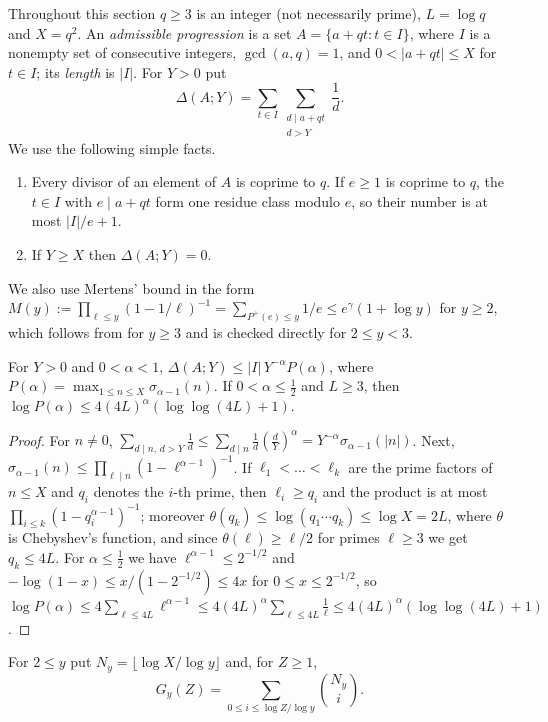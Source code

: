 Throughout this section $q\ge3$ is an integer (not necessarily prime), $L=\log q$ and $X=q^2$. An \emph{admissible
progression} is a set $A=\{a+qt:t\in I\}$, where $I$ is a nonempty set of consecutive integers, $\gcd(a,q)=1$, and
$0<|a+qt|\le X$ for $t\in I$; its \emph{length} is $|I|$. For $Y>0$ put
\[
\Delta(A;Y)=\sum_{t\in I}\sum_{\substack{d\mid a+qt\\ d>Y}}\frac1d.
\]
We use the following simple facts.
\begin{enumerate}[label=(F\arabic*),leftmargin=*]
\item Every divisor of an element of $A$ is coprime to $q$. If $e\ge1$ is coprime to $q$, the $t\in I$ with
$e\mid a+qt$ form one residue class modulo $e$, so their number is at most $|I|/e+1$.
\item If $Y\ge X$ then $\Delta(A;Y)=0$.
\end{enumerate}
We also use Mertens' bound in the form $M(y):=\prod_{\ell\le y}(1-1/\ell)^{-1}=\sum_{P^+(e)\le y}1/e\le e^\gamma(1+\log
y)$ for $y\ge2$, which follows from \cite[(3.30)]{b23} for $y\ge3$ and is checked directly for $2\le y<3$.

\begin{lemma}[Rankin]\label{lem:rankin}
For $Y>0$ and $0<\alpha<1$, $\Delta(A;Y)\le|I|\,Y^{-\alpha}P(\alpha)$, where
$P(\alpha)=\max_{1\le n\le X}\sigma_{\alpha-1}(n)$. If $0<\alpha\le\frac12$ and $L\ge3$, then
$\log P(\alpha)\le4(4L)^\alpha(\log\log(4L)+1)$.
\end{lemma}

\begin{proof}
For $n\ne0$, $\sum_{d\mid n,\,d>Y}\frac1d\le\sum_{d\mid n}\frac1d(\frac dY)^\alpha=Y^{-\alpha}\sigma_{\alpha-1}(|n|)$.
Next, $\sigma_{\alpha-1}(n)\le\prod_{\ell\mid n}(1-\ell^{\alpha-1})^{-1}$. If $\ell_1<\dots<\ell_k$ are the prime
factors of $n\le X$ and $q_i$ denotes the $i$-th prime, then $\ell_i\ge q_i$ and the product is at most
$\prod_{i\le k}(1-q_i^{\alpha-1})^{-1}$; moreover $\theta(q_k)\le\log(q_1\cdots q_k)\le\log X=2L$, where $\theta$ is
Chebyshev's function, and since $\theta(\ell)\ge\ell/2$ for primes $\ell\ge3$ we get $q_k\le4L$. For
$\alpha\le\frac12$ we have $\ell^{\alpha-1}\le2^{-1/2}$ and $-\log(1-x)\le x/(1-2^{-1/2})\le4x$ for
$0\le x\le2^{-1/2}$, so
$\log P(\alpha)\le4\sum_{\ell\le4L}\ell^{\alpha-1}\le4(4L)^\alpha\sum_{\ell\le4L}\frac1\ell\le4(4L)^\alpha(\log\log(4L)+1)$.
\end{proof}

For $2\le y$ put $N_y=\lfloor\log X/\log y\rfloor$ and, for $Z\ge1$,
\[
G_y(Z)=\sum_{0\le i\le\log Z/\log y}\binom{N_y}{i}.
\]

